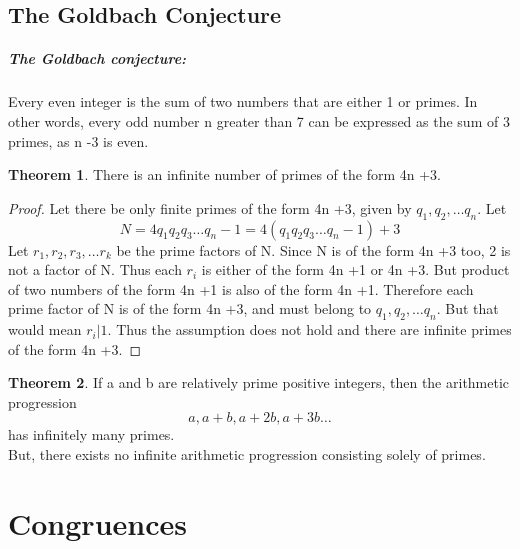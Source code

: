 \documentclass[15,a4paper]{report}
\theoremstyle{definition}
\newtheorem{theorem}{Theorem}[section]
\theoremstyle{remark}
\begin{document}
\section{The Goldbach Conjecture}
    \paragraph{The Goldbach conjecture:} Every even integer is the sum of two numbers that are either 1 or primes. In other words, every odd number n  greater than 7 can be expressed as the sum of 3 primes, as n -3 is even.  \begin{theorem}
        There is an infinite number of primes of the form 4n +3.
    \end{theorem}
        \begin{proof}
            Let there be only finite primes of the form 4n +3, given by $q_1,q_2,\dots q_n$. Let 
            \[ N = 4q_1q_2q_3\dots q_n -1 = 4(q_1q_2q_3\dots q_n -1) +3 \]
            Let $r_1,r_2,r_3, \dots r_k$ be the prime factors of N. Since N is of the form 4n +3 too, 2 is not a factor of N. Thus each $r_i$ is either of the form 4n +1 or 4n +3. But product of two numbers of the form 4n +1 is also of the form 4n +1. Therefore each prime  factor of N is of the form 4n +3, and must belong to $q_1,q_2,\dots q_n$. But that would mean $r_i|1$. Thus the assumption does not hold and there are infinite primes of the form 4n +3.
        \end{proof}
    \begin{theorem}
        If a and b are relatively prime positive integers, then the arithmetic progression \[a, a + b, a + 2b, a + 3b \dots \] has infinitely many primes.\\
        But, there exists no infinite arithmetic progression consisting solely of primes.
    \end{theorem}    





\chapter{Congruences}
\end{document}
